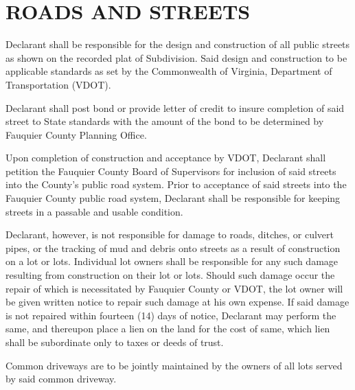 \documentclass[12pt, letterpaper]{article}
\begin{document}
\section{ROADS AND STREETS}
Declarant shall be responsible for the design and construction of all public streets as shown on the recorded plat of Subdivision.
Said design and construction to be applicable standards as set by the Commonwealth of Virginia, Department of Transportation (VDOT).

Declarant shall post bond or provide letter of credit to insure completion of said street to State standards with the amount of the bond to be determined by Fauquier County Planning Office.

Upon completion of construction and acceptance by VDOT, Declarant shall petition the Fauquier County Board of Supervisors for inclusion of said streets into the County's public road system.
Prior to acceptance of said streets into the Fauquier County public road system, Declarant shall be responsible for keeping streets in a passable and usable condition.

Declarant, however, is not responsible for damage to roads, ditches, or culvert pipes, or the tracking of mud and debris onto streets as a result of construction on a lot or lots.
Individual lot owners shall be responsible for any such damage resulting from construction on their lot or lots.
Should such damage occur the repair of which is necessitated by Fauquier County or VDOT, the lot owner will be given written notice to repair such damage at his own expense.
If said damage is not repaired within fourteen (14) days of notice, Declarant may perform the same, and thereupon place a lien on the land for the cost of same, which lien shall be subordinate only to taxes or deeds of trust.

Common driveways are to be jointly maintained by the owners of all lots served by said common driveway.
\end{document}
